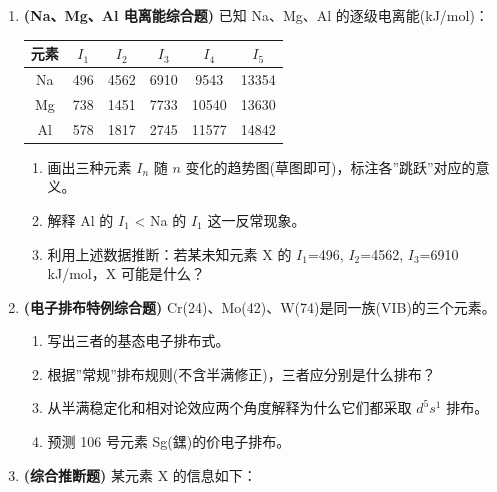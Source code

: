 \documentclass[a4paper,11pt]{ctexart}
\providecommand{\tightlist}{\setlength{\itemsep}{0pt}\setlength{\parskip}{0pt}}
\newcounter{none}
\newcommand{\箭}{\ensuremath{\rightarrow}}
\newcommand{\左箭}{\ensuremath{\leftarrow}}
\newcommand{\上箭}{\ensuremath{\uparrow}}
\newcommand{\下箭}{\ensuremath{\downarrow}}
\newcommand{\衡}{\ensuremath{\rightleftharpoons}}
\newcommand{\双箭}{\ensuremath{\leftrightarrow}}
\newcommand{\约等于}{\ensuremath{\approx}}
\newcommand{\小于等于}{\ensuremath{\leq}}
\newcommand{\大于等于}{\ensuremath{\geq}}
\newcommand{\不等于}{\ensuremath{\neq}}
\newcommand{\西格马}{\ensuremath{\sigma}}
\newcommand{\派}{\ensuremath{\pi}}
\begin{document}
\begin{enumerate}
  \begin{itemize}
  \tightlist
  \item
    \(\mathrm{Sc^{2+}}(3d^1) \to \mathrm{Sc^{3+}} + e^-\)，\(I = 24.75\) eV
  \item
    \(\mathrm{Sc^{2+}}(4s^1) \to \mathrm{Sc^{3+}} + e^-\)，\(I = 21.60\) eV
  \item
    \(\mathrm{Sc^+}(3d^1 4s^1) \to \mathrm{Sc} + e^-\)，\(E = -6.62\) eV
  \item
    \(\mathrm{Sc^+}(4s^2) \to \mathrm{Sc} + e^-\)，\(E = -7.98\) eV
  \item
    \(\mathrm{Sc}(3d^2 4s^1)\) 与 \(\mathrm{Sc}(3d^1 4s^2)\) 的能量差 \(\Delta E = 2.03\) eV
  \end{itemize}

  设轨道能 \(U_3\)(3d)、\(U_4\)(4s)；电子排斥参数 \(J_{dd}\)、\(J_{ds}\)、\(J_{ss}\)。利用 Koopmans 定理(\(I \approx -U\))列出方程组，解出五个参数，判断哪种排布能量最低。
\item
  \textbf{(Na、Mg、Al 电离能综合题)} 已知 Na、Mg、Al 的逐级电离能(kJ/mol)：

  {\def\LTcaptype{none} %
  \begin{longtable}[]{@{}cccccc@{}}
  \toprule\noalign{}
  元素 & \(I_1\) & \(I_2\) & \(I_3\) & \(I_4\) & \(I_5\) \\
  \midrule\noalign{}
  \endhead
  \bottomrule\noalign{}
  \endlastfoot
  Na & 496 & 4562 & 6910 & 9543 & 13354 \\
  Mg & 738 & 1451 & 7733 & 10540 & 13630 \\
  Al & 578 & 1817 & 2745 & 11577 & 14842 \\
  \end{longtable}
  }

  \begin{enumerate}
  \def\labelenumii{(\alph{enumii})}
  \tightlist
  \item
    画出三种元素 \(I_n\) 随 \(n\) 变化的趋势图(草图即可)，标注各''跳跃''对应的意义。
  \item
    解释 Al 的 \(I_1\) \textless{} Na 的 \(I_1\) 这一反常现象。
  \item
    利用上述数据推断：若某未知元素 X 的 \(I_1\)=496, \(I_2\)=4562, \(I_3\)=6910 kJ/mol，X 可能是什么？
  \end{enumerate}
\item
  \textbf{(电子排布特例综合题)} Cr(24)、Mo(42)、W(74)是同一族(VIB)的三个元素。

  \begin{enumerate}
  \def\labelenumii{(\alph{enumii})}
  \tightlist
  \item
    写出三者的基态电子排布式。
  \item
    根据''常规''排布规则(不含半满修正)，三者应分别是什么排布？
  \item
    从半满稳定化和相对论效应两个角度解释为什么它们都采取 \(d^5 s^1\) 排布。
  \item
    预测 106 号元素 Sg(𨭆)的价电子排布。
  \end{enumerate}
\item
  \textbf{(综合推断题)} 某元素 X 的信息如下：


\end{enumerate}
\end{document}
